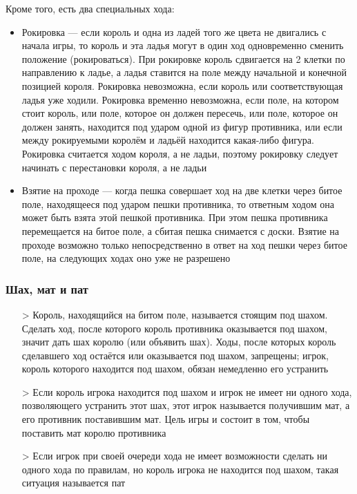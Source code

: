 \begin{itemize}
\end{itemize}
Кроме того, есть два специальных хода:
\begin{itemize}
\item Рокировка — если король и одна из ладей того же цвета не двигались с начала игры, то король и эта ладья могут в один ход одновременно сменить положение (рокироваться). При рокировке король сдвигается на 2 клетки по направлению к ладье, а ладья ставится на поле между начальной и конечной позицией короля. Рокировка невозможна, если король или соответствующая ладья уже ходили. Рокировка временно невозможна, если поле, на котором стоит король, или поле, которое он должен пересечь, или поле, которое он должен занять, находится под ударом одной из фигур противника, или если между рокируемыми королём и ладьёй находится какая-либо фигура. Рокировка считается ходом короля, а не ладьи, поэтому рокировку следует начинать с перестановки короля, а не ладьи\\
\item Взятие на проходе — когда пешка совершает ход на две клетки через битое поле, находящееся под ударом пешки противника, то ответным ходом она может быть взята этой пешкой противника. При этом пешка противника перемещается на битое поле, а сбитая пешка снимается с доски. Взятие на проходе возможно только непосредственно в ответ на ход пешки через битое поле, на следующих ходах оно уже не разрешено\\
\end{itemize}

\subsubsection*{Шах, мат и пат}
\begin{itemize}
\item[>] Король, находящийся на битом поле, называется стоящим под шахом. Сделать ход, после которого король противника оказывается под шахом, значит дать шах королю (или объявить шах). Ходы, после которых король сделавшего ход остаётся или оказывается под шахом, запрещены; игрок, король которого находится под шахом, обязан немедленно его устранить\\
\item[>] Если король игрока находится под шахом и игрок не имеет ни одного хода, позволяющего устранить этот шах, этот игрок называется получившим мат, а его противник поставившим мат. Цель игры и состоит в том, чтобы поставить мат королю противника\\
\item[>]  Если игрок при своей очереди хода не имеет возможности сделать ни одного хода по правилам, но король игрока не находится под шахом, такая ситуация называется пат\\
\end{itemize}

